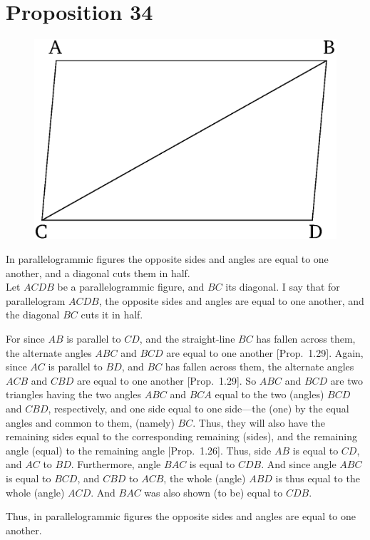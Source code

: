 \chapter*{Proposition 34}



\begin{figure}[ht]
    \begin{center}
    \includegraphics[width=0.5\linewidth]{figures/fig34e.eps}
    \label{fig:prop_34}
    \end{center}
\end{figure}

In parallelogrammic figures the opposite sides and angles are equal to one
another, and a diagonal cuts them in half.\\

Let $ACDB$ be a parallelogrammic figure, and $BC$ its diagonal. I say that
for parallelogram $ACDB$, the opposite sides and angles are equal to
one another, and the diagonal $BC$ cuts it in half.

For since $AB$ is parallel to $CD$, and the straight-line $BC$ has fallen
across  them, the alternate angles $ABC$ and $BCD$ are equal to one another [Prop.~1.29]. 
Again, since $AC$ is parallel to $BD$, and $BC$ has fallen across them, the
alternate angles $ACB$ and $CBD$ are equal to one another [Prop.~1.29]. 
So $ABC$ and $BCD$ are two triangles having the two angles $ABC$ and
$BCA$ equal to the two (angles) $BCD$ and $CBD$, respectively, and one
side equal to one side---the (one) by the equal angles and common to them, (namely) $BC$. Thus,
they will also  have the remaining sides  equal to the corresponding
remaining (sides), and the remaining angle (equal) to the remaining angle [Prop.~1.26].
Thus, side $AB$ is equal to $CD$, and $AC$ to $BD$. Furthermore, angle $BAC$ is 
equal to $CDB$. And since angle $ABC$ is equal to $BCD$, and $CBD$ to
$ACB$, the whole (angle) $ABD$ is thus equal to the whole (angle) $ACD$.
And  $BAC$ was also shown  (to be) equal to $CDB$.

Thus, in parallelogrammic figures the opposite sides and angles are equal
to one another.

